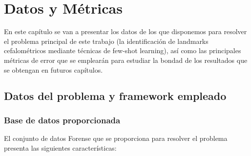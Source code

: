 \chapter{Datos y Métricas}

    \noindent En este capítulo se van a presentar los datos de los que disponemos para resolver el problema principal de este trabajo (la identificación de landmarks cefalométricos mediante técnicas de few-shot learning), así como las principales métricas de error que se emplearán para estudiar la bondad de los resultados que se obtengan en futuros capítulos.

    \section{Datos del problema y framework empleado}
        \subsection{Base de datos proporcionada}
            \noindent El conjunto de datos Forense que se proporciona para resolver el problema presenta las siguientes características: 

